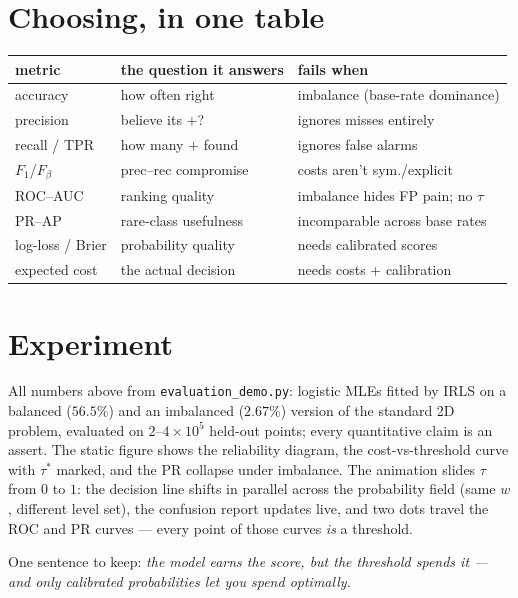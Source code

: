 \documentclass[11pt]{article}
\begin{document}
\section{Choosing, in one table}

\begin{center}
\begin{tabular}{lll}
\toprule
metric & the question it answers & fails when\\
\midrule
accuracy & how often right & imbalance (base-rate dominance)\\
precision & believe its $+$? & ignores misses entirely\\
recall / TPR & how many $+$ found & ignores false alarms\\
$F_1$/$F_\beta$ & prec--rec compromise & costs aren't sym./explicit\\
ROC--AUC & ranking quality & imbalance hides FP pain; no $\tau$\\
PR--AP & rare-class usefulness & incomparable across base rates\\
log-loss / Brier & probability quality & needs calibrated scores\\
expected cost & the actual decision & needs costs + calibration\\
\bottomrule
\end{tabular}
\end{center}

\section{Experiment}

All numbers above from \texttt{evaluation\_demo.py}: logistic MLEs
fitted by IRLS on a balanced ($56.5\%$) and an imbalanced ($2.67\%$)
version of the standard 2D problem, evaluated on $2$--$4\times10^5$
held-out points; every quantitative claim is an assert. The static
figure shows the reliability diagram, the cost-vs-threshold curve with
$\tau^\ast$ marked, and the PR collapse under imbalance. The animation
slides $\tau$ from $0$ to $1$: the decision line shifts in parallel
across the probability field (same $w$, different level set), the
confusion report updates live, and two dots travel the ROC and PR
curves --- every point of those curves \emph{is} a threshold.

One sentence to keep: \emph{the model earns the score, but the
threshold spends it --- and only calibrated probabilities let you
spend optimally.}
\end{document}
